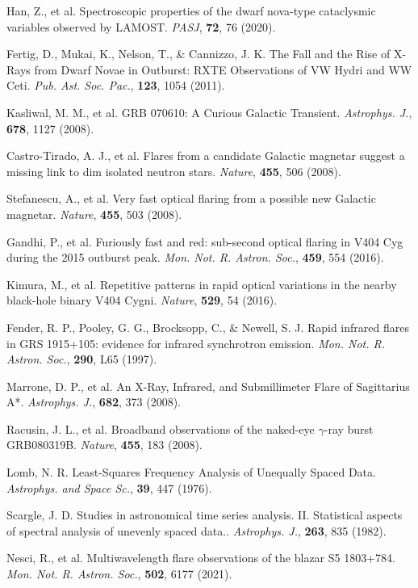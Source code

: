 \documentclass{nature_plusfigure}
\newcommand{\mn}{{Mon. Not. R. Astron. Soc.}}
\newcommand{\mnras}{\mn}
\newcommand{\apj}{{Astrophys. J.}}
\newcommand{\apss}{{Astrophys. and Space Sc.}}
\newcommand{\nat}{{Nature}}
\newcommand{\pasj}{{PASJ}}
\newcommand{\pasp}{{Pub. Ast. Soc. Pac.}}
\begin{document}
\begin{methods}
\begin{thebibliography}{10}
 Han, Z., et al. Spectroscopic properties of the dwarf nova-type cataclysmic variables observed by LAMOST. \emph{\pasj}, \textbf{72}, 76 (2020). 

 Fertig, D., Mukai, K., Nelson, T., \& Cannizzo, J. K. The Fall and the Rise of X-Rays from Dwarf Novae in Outburst: RXTE Observations of VW Hydri and WW Ceti. \emph{\pasp}, \textbf{123}, 1054 (2011). 

 Kasliwal, M. M., et al. GRB 070610: A Curious Galactic Transient. \emph{\apj}, \textbf{678}, 1127 (2008). 

 Castro-Tirado, A. J., et al. Flares from a candidate Galactic magnetar suggest a missing link to dim isolated neutron stars. \emph{\nat}, \textbf{455}, 506 (2008). 

 Stefanescu, A., et al. Very fast optical flaring from a possible new Galactic magnetar. \emph{\nat}, \textbf{455}, 503 (2008). 

 Gandhi, P., et al. Furiously fast and red: sub-second optical flaring in V404 Cyg during the 2015 outburst peak. \emph{\mnras}, \textbf{459}, 554 (2016). 

 Kimura, M., et al. Repetitive patterns in rapid optical variations in the nearby black-hole binary V404 Cygni. \emph{\nat}, \textbf{529}, 54 (2016). 

 Fender, R. P., Pooley, G. G., Brocksopp, C., \& Newell, S. J. Rapid infrared flares in GRS 1915+105: evidence for infrared synchrotron emission. \emph{\mnras}, \textbf{290}, L65 (1997). 

 Marrone, D. P., et al. An X-Ray, Infrared, and Submillimeter Flare of Sagittarius A*. \emph{\apj}, \textbf{682}, 373 (2008). 

 Racusin, J. L., et al. Broadband observations of the naked-eye $\gamma$-ray burst GRB080319B. \emph{\nat}, \textbf{455}, 183 (2008). 

 Lomb, N. R. Least-Squares Frequency Analysis of Unequally Spaced Data. \emph{\apss}, \textbf{39}, 447 (1976). 

 Scargle, J. D. Studies in astronomical time series analysis. II. Statistical aspects of spectral analysis of unevenly spaced data.. \emph{\apj}, \textbf{263}, 835 (1982). 

 Nesci, R., et al. Multiwavelength flare observations of the blazar S5 1803+784. \emph{\mnras}, \textbf{502}, 6177 (2021). 


\end{thebibliography}

\end{methods}
\end{document}
